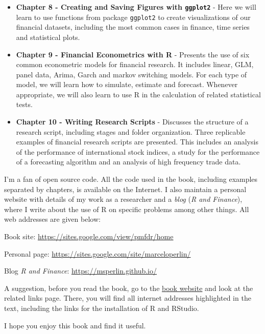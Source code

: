 \documentclass[11pt,]{book}
\begin{document}
\begin{itemize}
\item
  \textbf{Chapter 8 - Creating and Saving Figures with \texttt{ggplot2}}
  - Here we will learn to use functions from package \texttt{ggplot2} to
  create visualizations of our financial datasets, including the most
  common cases in finance, time series and statistical plots.
\item
  \textbf{Chapter 9 - Financial Econometrics with R} - Presents the use
  of six common econometric models for financial research. It includes
  linear, GLM, panel data, Arima, Garch and markov switching models. For
  each type of model, we will learn how to simulate, estimate and
  forecast. Whenever appropriate, we will also learn to use R in the
  calculation of related statistical tests.
\item
  \textbf{Chapter 10 - Writing Research Scripts} - Discusses the
  structure of a research script, including stages and folder
  organization. Three replicable examples of financial research scripts
  are presented. This includes an analysis of the performance of
  international stock indices, a study for the performance of a
  forecasting algorithm and an analysis of high frequency trade data.
\end{itemize}

I'm a fan of open source code. All the code used in the book, including
examples separated by chapters, is available on the Internet. I also
maintain a personal website with details of my work as a researcher and
a \emph{blog} (\emph{R and Finance}), where I write about the use of R
on specific problems among other things. All web addresses are given
below:

\vspace{0.5cm}

Book site: \url{https://sites.google.com/view/pmfdr/home}

Personal page: \url{https://sites.google.com/site/marceloperlin/}

Blog \emph{R and Finance}: \url{https://msperlin.github.io/}

\vspace{0.5cm}

A suggestion, before you read the book, go to the
\href{https://sites.google.com/view/pmfdr/home}{book website} and look
at the related links page. There, you will find all internet addresses
highlighted in the text, including the links for the installation of R
and RStudio.

I hope you enjoy this book and find it useful.
\end{document}
